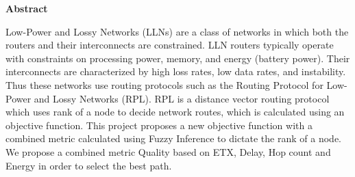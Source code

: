 \begin{center}
\begin{huge}
\bfseries{Abstract}
\end{huge}
\end{center}
\noindent Low-Power and Lossy Networks (LLNs) are a class of networks in which both the routers and their interconnects are constrained.  LLN routers typically operate with constraints on processing power, memory, and energy (battery power). Their interconnects are characterized by high loss rates, low data rates, and instability. Thus these networks use routing protocols such as the Routing Protocol for Low-Power and Lossy Networks (RPL). RPL is a distance vector routing protocol which uses rank of a node to decide network routes, which is calculated using an objective function. This project proposes a new objective function with a combined metric calculated using Fuzzy Inference to dictate the rank of a node. We propose a combined metric Quality based on ETX, Delay, Hop count and Energy in order to select the best path.
\pagebreak
